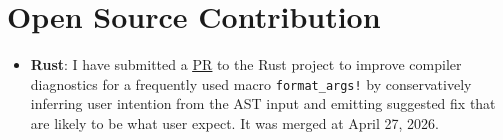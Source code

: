 \documentclass[letterpaper,11pt]{article}
\makeatletter
\newcommand{\resumeItem}[1]{
  \item\small{
    {#1 \vspace{-2pt}}
  }
}
\newcommand{\resumeSubheading}[4]{
  \vspace{-2pt}\item
    \begin{tabular*}{0.97\textwidth}[t]{l@{\extracolsep{\fill}}r}
      \textbf{#1} & #2 \\
      \textit{\small#3} & \textit{\small #4} \\
    \end{tabular*}\vspace{-7pt}
}
\newcommand{\resumeSubSubheading}[2]{
    \item
    \begin{tabular*}{0.97\textwidth}{l@{\extracolsep{\fill}}r}
      \textit{\small#1} & \textit{\small #2} \\
    \end{tabular*}\vspace{-7pt}
}
\newcommand{\resumeSubHeadingListEnd}{\end{itemize}}
\newcommand{\resumeItemListStart}{\begin{itemize}}
\newcommand{\resumeItemListEnd}{\end{itemize}\vspace{-5pt}}
\makeatother
\begin{document}




\section{Open Source Contribution}
\begin{itemize}[leftmargin=0.15in, label={}]
	\item \textbf{Rust}: I have submitted a
	      \href{https://github.com/rust-lang/rust/pull/155693}{\underline{PR}} to the Rust project to
	      improve compiler diagnostics for a frequently used macro \texttt{format\_args!} by
	      conservatively inferring user intention from the AST input and emitting suggested fix that
	      are likely to be what user expect. It was merged at April 27, 2026.
\end{itemize}
\end{document}
